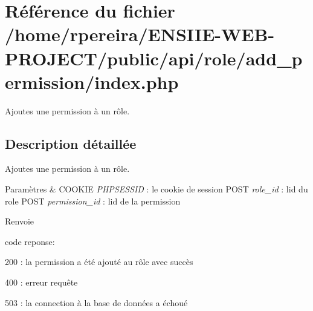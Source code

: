 \hypertarget{role_2add__permission_2index_8php}{}\section{Référence du fichier /home/rpereira/\+E\+N\+S\+I\+I\+E-\/\+W\+E\+B-\/\+P\+R\+O\+J\+E\+C\+T/public/api/role/add\+\_\+permission/index.php}
\label{role_2add__permission_2index_8php}


Ajoutes une permission à un rôle.  




\subsection{Description détaillée}
Ajoutes une permission à un rôle. 


\begin{DoxyParams}{Paramètres}
{\em } & C\+O\+O\+K\+IE {\itshape P\+H\+P\+S\+E\+S\+S\+ID} \+: le cookie de session P\+O\+ST {\itshape role\+\_\+id} \+: l\textquotesingle{}id du role P\+O\+ST {\itshape permission\+\_\+id} \+: l\textquotesingle{}id de la permission \\
\hline
\end{DoxyParams}
\begin{DoxyReturn}{Renvoie}

\begin{DoxyItemize}
\item code reponse\+:
\begin{DoxyItemize}
\item 200 \+: la permission a été ajouté au rôle avec succès
\item 400 \+: erreur requête
\item 503 \+: la connection à la base de données a échoué 
\end{DoxyItemize}
\end{DoxyItemize}
\end{DoxyReturn}
